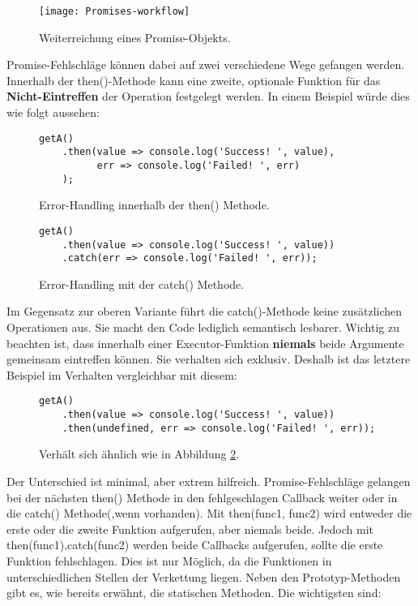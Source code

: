 \begin{figure}[H]
\texttt{[image: Promises-workflow]}
\caption{Weiterreichung eines Promise-Objekts\cite{promise-executor}.}
\label{promise-chain-graphic}
\end{figure}

\noindent
Promise-Fehlschläge können dabei auf zwei verschiedene Wege gefangen werden. Innerhalb der then()-Methode kann eine zweite, optionale Funktion für das \textbf{Nicht-Eintreffen} der Operation festgelegt werden. In einem Beispiel würde dies wie folgt aussehen:

\begin{figure}[H]
\begin{lstlisting}[basicstyle=\small]
getA()
    .then(value => console.log('Success! ', value),
          err => console.log('Failed! ', err)
    );
\end{lstlisting}
\caption{Error-Handling innerhalb der then() Methode\cite{callback-vs-promises}.}
\end{figure}

\begin{figure}[H]
\begin{lstlisting}[basicstyle=\small]
getA()
    .then(value => console.log('Success! ', value))
    .catch(err => console.log('Failed! ', err));
\end{lstlisting}
\caption{Error-Handling mit der catch() Methode\cite{callback-vs-promises}.}
\label{error-with-catch}
\end{figure}

\noindent
Im Gegensatz zur oberen Variante führt die catch()-Methode keine zusätzlichen Operationen aus. Sie macht den Code lediglich semantisch lesbarer. Wichtig zu beachten ist, dass innerhalb einer Executor-Funktion \textbf{niemals} beide Argumente gemeinsam eintreffen können. Sie verhalten sich exklusiv. Deshalb ist das letztere Beispiel im Verhalten vergleichbar mit diesem:

\begin{figure}[H]
\begin{lstlisting}[basicstyle=\small]
getA()
    .then(value => console.log('Success! ', value))
    .then(undefined, err => console.log('Failed! ', err));
\end{lstlisting}
\caption{Verhält sich ähnlich wie in Abbildung \ref{error-with-catch}.}
\end{figure}

\noindent
Der Unterschied ist minimal, aber extrem hilfreich. Promise-Fehlschläge gelangen bei der nächsten then() Methode in den fehlgeschlagen Callback weiter oder in die catch() Methode(,wenn vorhanden). Mit then(func1, func2) wird entweder die erste oder die zweite Funktion aufgerufen, aber niemals beide. Jedoch mit then(func1).catch(func2) werden beide Callbacks aufgerufen, sollte die erste Funktion fehlschlagen. Dies ist nur Möglich, da die Funktionen in unterschiedlichen Stellen der Verkettung liegen. Neben den Prototyp-Methoden gibt es, wie bereits erwähnt, die statischen Methoden. Die wichtigsten sind:

